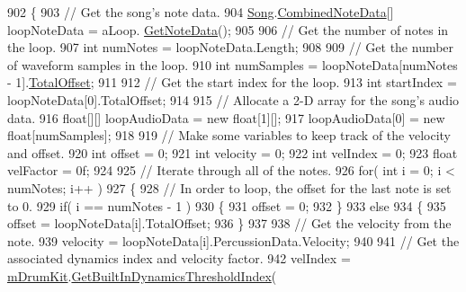 \begin{DoxyCode}
902     \{
903         \textcolor{comment}{// Get the song's note data.}
904         \hyperlink{class_song}{Song}.\hyperlink{group___song_structs_struct_song_1_1_combined_note_data}{CombinedNoteData}[] loopNoteData = aLoop.
      \hyperlink{group___song_pub_func_gae3df1fd5448b7d9cefb0fed4af967985}{GetNoteData}();
905 
906         \textcolor{comment}{// Get the number of notes in the loop.}
907         \textcolor{keywordtype}{int} numNotes = loopNoteData.Length;
908 
909         \textcolor{comment}{// Get the number of waveform samples in the loop.}
910         \textcolor{keywordtype}{int} numSamples = loopNoteData[numNotes - 1].\hyperlink{group___song_structs_a9a0f4830f464d3c7e7f4f156ce490cec}{TotalOffset};
911 
912         \textcolor{comment}{// Get the start index for the loop.}
913         \textcolor{keywordtype}{int} startIndex = loopNoteData[0].TotalOffset;
914 
915         \textcolor{comment}{// Allocate a 2-D array for the song's audio data.}
916         \textcolor{keywordtype}{float}[][] loopAudioData = \textcolor{keyword}{new} \textcolor{keywordtype}{float}[1][];
917         loopAudioData[0] = \textcolor{keyword}{new} \textcolor{keywordtype}{float}[numSamples];
918 
919         \textcolor{comment}{// Make some variables to keep track of the velocity and offset.}
920         \textcolor{keywordtype}{int} offset = 0;
921         \textcolor{keywordtype}{int} velocity = 0;
922         \textcolor{keywordtype}{int} velIndex = 0;
923         \textcolor{keywordtype}{float} velFactor = 0f;
924 
925         \textcolor{comment}{// Iterate through all of the notes.}
926         \textcolor{keywordflow}{for}( \textcolor{keywordtype}{int} i = 0; i < numNotes; i++ )
927         \{
928             \textcolor{comment}{// In order to loop, the offset for the last note is set to 0.}
929             \textcolor{keywordflow}{if}( i == numNotes - 1 )
930             \{
931                 offset = 0;
932             \}
933             \textcolor{keywordflow}{else}
934             \{
935                 offset = loopNoteData[i].TotalOffset;
936             \}
937             
938             \textcolor{comment}{// Get the velocity from the note.}
939             velocity = loopNoteData[i].PercussionData.Velocity;
940 
941             \textcolor{comment}{// Get the associated dynamics index and velocity factor.}
942             velIndex = \hyperlink{group___v_i_m_priv_ga0bc7c9f776b0d2dae0ccb1f1ee5f2143}{mDrumKit}.\hyperlink{group___v_i_base_pub_func_gacddf07c08c3a8154a6934be22f539788}{GetBuiltInDynamicsThresholdIndex}( 

\end{DoxyCode}
